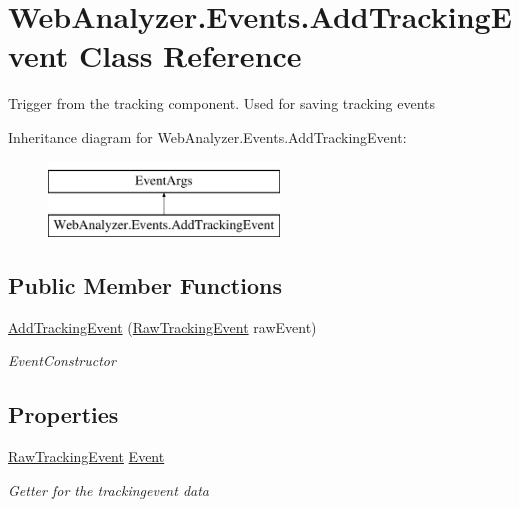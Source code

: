 \hypertarget{class_web_analyzer_1_1_events_1_1_add_tracking_event}{}\section{Web\+Analyzer.\+Events.\+Add\+Tracking\+Event Class Reference}
\label{class_web_analyzer_1_1_events_1_1_add_tracking_event}


Trigger from the tracking component. Used for saving tracking events  


Inheritance diagram for Web\+Analyzer.\+Events.\+Add\+Tracking\+Event\+:\begin{figure}[H]
\begin{center}
\leavevmode
\includegraphics[height=2.000000cm]{class_web_analyzer_1_1_events_1_1_add_tracking_event}
\end{center}
\end{figure}
\subsection*{Public Member Functions}
\begin{DoxyCompactItemize}
\item 
\hyperlink{class_web_analyzer_1_1_events_1_1_add_tracking_event_aa6bdf6822e677603f63c38f8f25b4173}{Add\+Tracking\+Event} (\hyperlink{class_web_analyzer_1_1_models_1_1_base_1_1_raw_tracking_event}{Raw\+Tracking\+Event} raw\+Event)
\begin{DoxyCompactList}\small\item\em Event\+Constructor \end{DoxyCompactList}\end{DoxyCompactItemize}
\subsection*{Properties}
\begin{DoxyCompactItemize}
\item 
\hyperlink{class_web_analyzer_1_1_models_1_1_base_1_1_raw_tracking_event}{Raw\+Tracking\+Event} \hyperlink{class_web_analyzer_1_1_events_1_1_add_tracking_event_aac855bc1f8abb62af8501d10be516dd2}{Event}
\begin{DoxyCompactList}\small\item\em Getter for the trackingevent data \end{DoxyCompactList}\end{DoxyCompactItemize}
